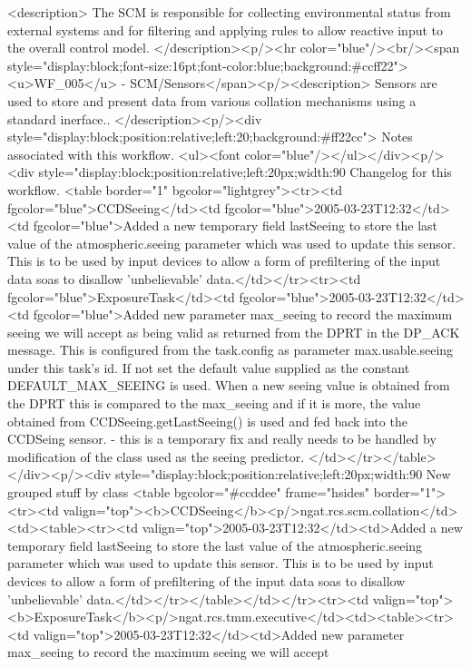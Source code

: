     <description>
      The SCM is responsible for collecting environmental status from external systems and for
      filtering and applying rules to allow reactive input to the overall control model.
    </description><p/><hr color="blue"/><br/><span style="display:block;font-size:16pt;font-color:blue;background:#ccff22"><u>WF_005</u> -    SCM/Sensors</span><p/><description>
	Sensors are used to store and present data from various collation mechanisms using a standard
	inerface..
      </description><p/><div style="display:block;position:relative;left:20;background:#ff22cc">
      Notes associated with this workflow.
      <ul><font color="blue"/></ul></div><p/><div style="display:block;position:relative;left:20px;width:90%
      Changelog for this workflow.
      <table border="1" bgcolor="lightgrey"><tr><td fgcolor="blue">CCDSeeing</td><td fgcolor="blue">2005-03-23T12:32</td><td fgcolor="blue">Added a new temporary field lastSeeing to store the last value of the atmospheric.seeing
	    parameter which was used to update this sensor. This is to be used by input devices to allow
	    a form of prefiltering of the input data soas to disallow 'unbelievable' data.</td></tr><tr><td fgcolor="blue">ExposureTask</td><td fgcolor="blue">2005-03-23T12:32</td><td fgcolor="blue">Added new parameter max_seeing to record the maximum seeing we will accept
	    as being valid as returned from the DPRT in the DP_ACK message. This is configured from the
	    task.config as parameter max.usable.seeing under this task's id. If not set the default value supplied as
	    the constant DEFAULT_MAX_SEEING is used. When a new seeing value is obtained from the DPRT this is compared
	    to the max_seeing and if it is more, the value obtained from CCDSeeing.getLastSeeing() 
	    is used and fed back into the CCDSeing sensor. - this is a temporary fix and really needs to be handled 
	    by modification of the class used as the seeing predictor.
	  </td></tr></table></div><p/><div style="display:block;position:relative;left:20px;width:90%
     New grouped stuff by class
     <table bgcolor="#ccddee" frame="hsides" border="1"><tr><td valign="top"><b>CCDSeeing</b><p/>ngat.rcs.scm.collation</td><td><table><tr><td valign="top">2005-03-23T12:32</td><td>Added a new temporary field lastSeeing to store the last value of the atmospheric.seeing
	    parameter which was used to update this sensor. This is to be used by input devices to allow
	    a form of prefiltering of the input data soas to disallow 'unbelievable' data.</td></tr></table></td></tr><tr><td valign="top"><b>ExposureTask</b><p/>ngat.rcs.tmm.executive</td><td><table><tr><td valign="top">2005-03-23T12:32</td><td>Added new parameter max_seeing to record the maximum seeing we will accept
